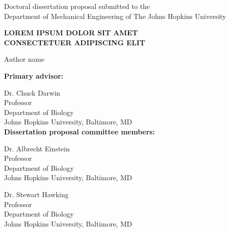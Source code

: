 \documentclass[12pt]{article}
\numberwithin{equation}{section}
\begin{document}







\vspace*{0.025in}
\thispagestyle{empty}

\begin{center}
    Doctoral dissertation proposal submitted to the \\
    Department of Mechanical Engineering of The Johns Hopkins University \\
    
    \vspace{0.75in}

    \MakeUppercase{\textbf{LOREM IPSUM DOLOR SIT AMET\\CONSECTETUER ADIPISCING ELIT}}       %
    
    \vspace{0.25in}
    
    Author name   %
\end{center}

\vspace{0.75in}




\begin{singlespace}

    \textbf{Primary advisor:}
    
    Dr. Chuck Darwin \\
    Professor \\
    Department of Biology \\
    Johns Hopkins University, Baltimore, MD \\

    \textbf{Dissertation proposal committee members:} 
    
    Dr. Albrecht Einstein \\
    Professor\\
    Department of Biology \\
    Johns Hopkins University, Baltimore, MD
    
    Dr. Stewart Hawking \\
    Professor\\
    Department of Biology \\
    Johns Hopkins University, Baltimore, MD 
    
\end{singlespace}
\end{document}
